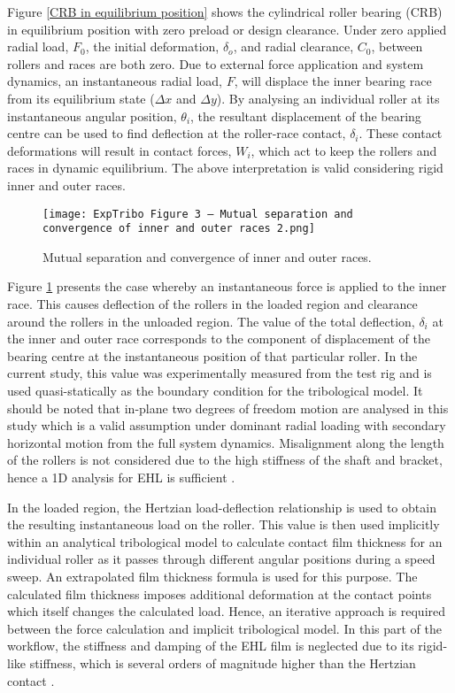 Figure \ref{CRB in equilibrium position} shows the cylindrical roller bearing (CRB) in equilibrium position with zero preload or design clearance. Under zero applied radial load, $F_0$, the initial deformation, $\delta_o$, and radial clearance, $C_0$, between rollers and races are both zero. Due to external force application and system dynamics, an instantaneous radial load, $F$, will displace the inner bearing race from its equilibrium state ($\Delta x$ and $\Delta y$). By analysing an individual roller at its instantaneous angular position, $\theta_i$, the resultant displacement of the bearing centre can be used to find deflection at the roller-race contact, $\delta_i$. These contact deformations will result in contact forces, $W_i$, which act to keep the rollers and races in dynamic equilibrium. The above interpretation is valid considering rigid inner and outer races.

\begin{figure}
	\centering
	\texttt{[image: ExpTribo Figure 3 – Mutual separation and convergence of inner and outer races 2.png]}
	\caption{Mutual separation and convergence of inner and outer races.}
	\label{Mutual separation and convergence of inner and outer races}
\end{figure}

Figure \ref{Mutual separation and convergence of inner and outer races} presents the case whereby an instantaneous force is applied to the inner race. This causes deflection of the rollers in the loaded region and clearance around the rollers in the unloaded region. The value of the total deflection, $\delta_i$ at the inner and outer race corresponds to the component of displacement of the bearing centre at the instantaneous position of that particular roller. In the current study, this value was experimentally measured from the test rig and is used quasi-statically as the boundary condition for the tribological model. It should be noted that in-plane two degrees of freedom motion are analysed in this study which is a valid assumption under dominant radial loading with secondary horizontal motion from the full system dynamics. Misalignment along the length of the rollers is not considered due to the high stiffness of the shaft and bracket, hence a 1D analysis for EHL is sufficient \cite{Gupta1979}.

In the loaded region, the Hertzian load-deflection relationship is used to obtain the resulting instantaneous load on the roller. This value is then used implicitly within an analytical tribological model to calculate contact film thickness for an individual roller as it passes through different angular positions during a speed sweep. An extrapolated film thickness formula is used for this purpose. The calculated film thickness imposes additional deformation at the contact points which itself changes the calculated load. Hence, an iterative approach is required between the force calculation and implicit tribological model. In this part of the workflow, the stiffness and damping of the EHL film is neglected due to its rigid-like stiffness, which is several orders of magnitude higher than the Hertzian contact \cite{Walford1983} \cite{Dareing1975} \cite{Mehdigoli1990}.

